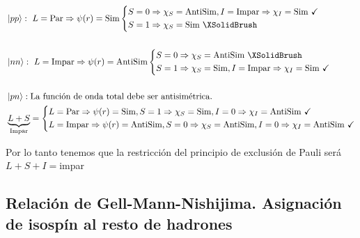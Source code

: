 \begin{equation*}
    \begin{aligned}
        & \ket{pp}: \ L=\mathrm{Par} \Rightarrow \psi(r)=\mathrm{Sim} \left \{ \begin{aligned}
            &S=0 \Rightarrow \chi_S=\text{AntiSim},I=\text{Impar}\Rightarrow \chi_I=\text{Sim \checkmark}\\
            &S=1 \Rightarrow \chi_S=\text{Sim \XSolidBrush}
        \end{aligned}\right.\\\\
        & \ket{nn}: \ L=\mathrm{Impar} \Rightarrow \psi(r)=\mathrm{AntiSim} \left \{ \begin{aligned}
            &S=0 \Rightarrow \chi_S=\text{AntiSim \XSolidBrush}\\
            &S=1 \Rightarrow \chi_S=\text{Sim}, I=\text{Impar}\Rightarrow \chi_I=\text{Sim \checkmark}
        \end{aligned}\right.\\\\
        & \ket{pn}: \text{La función de onda total debe ser antisimétrica.}\\
        & \underbrace{L+S}_{\text{Impar}}= \left \{\begin{aligned}
            &L=\text{Par} \Rightarrow \psi(r)=\text{Sim}, S=1\Rightarrow \chi_S=\text{Sim}, I=0 \Rightarrow \chi_I=\text{AntiSim \checkmark}\\
            &L=\text{Impar} \Rightarrow \psi(r)=\text{AntiSim}, S=0\Rightarrow \chi_S=\text{AntiSim}, I=0 \Rightarrow \chi_I=\text{AntiSim \checkmark}
        \end{aligned} \right.
    \end{aligned}
\end{equation*}

\noindent Por lo tanto tenemos que la restricción del principio de exclusión de Pauli será $L+S+I=$impar
\subsection{Relación de Gell-Mann-Nishijima. Asignación de isospín al resto de hadrones}
